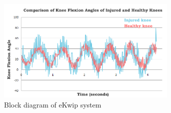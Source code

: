 \begin{figure}[h]
  \begin{center}
    \includegraphics[width=3.4in]{images/results_graph.PNG}
  \end{center}
  \caption{Block diagram of eKwip system}
  \label{fig:results_graph}
\end{figure}